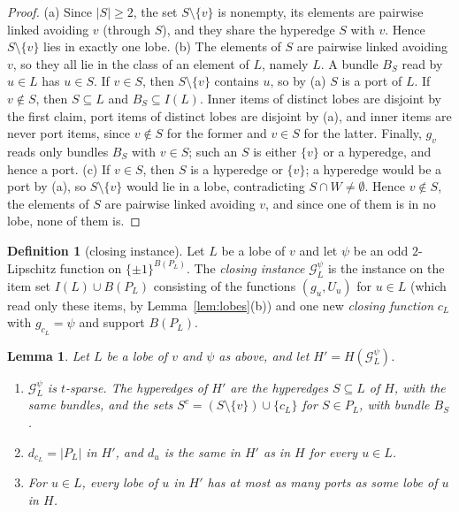 \documentclass[11pt,letterpaper]{article}
\newtheorem{lemma}[theorem]{Lemma}
\theoremstyle{definition}
\newtheorem{definition}[theorem]{Definition}
\newcommand{\cG}{\mathcal{G}}
\newcommand{\cube}[1]{\{\pm1\}^{#1}}
\begin{document}
\begin{proof}
(a) Since $|S|\ge2$, the set $S\setminus\{v\}$ is nonempty, its elements are pairwise linked
avoiding $v$ (through $S$), and they share the hyperedge $S$ with $v$. Hence $S\setminus\{v\}$
lies in exactly one lobe.
(b) The elements of $S$ are pairwise linked avoiding $v$, so they all lie in the class of an
element of $L$, namely $L$. A bundle $B_S$ read by $u\in L$ has $u\in S$. If $v\in S$, then
$S\setminus\{v\}$ contains $u$, so by (a) $S$ is a port of $L$. If $v\notin S$, then $S\subseteq L$
and $B_S\subseteq I(L)$. Inner items of distinct lobes are disjoint by the first claim, port items
of distinct lobes are disjoint by (a), and inner items are never port items, since $v\notin S$ for
the former and $v\in S$ for the latter. Finally, $g_v$ reads only bundles $B_S$ with $v\in S$; such
an $S$ is either $\{v\}$ or a hyperedge, and hence a port.
(c) If $v\in S$, then $S$ is a hyperedge or $\{v\}$; a hyperedge would be a port by (a), so
$S\setminus\{v\}$ would lie in a lobe, contradicting $S\cap W\ne\emptyset$. Hence $v\notin S$, the
elements of $S$ are pairwise linked avoiding $v$, and since one of them is in no lobe, none of them
is.
\end{proof}

\begin{definition}[closing instance]\label{def:closing}
Let $L$ be a lobe of $v$ and let $\psi$ be an odd $2$-Lipschitz function on $\cube{B(P_L)}$. The
\emph{closing instance} $\cG_L^\psi$ is the instance on the item set $I(L)\cup B(P_L)$ consisting
of the functions $(g_u,U_u)$ for $u\in L$ (which read only these items, by
Lemma~\ref{lem:lobes}(b)) and one new \emph{closing function} $c_L$ with $g_{c_L}=\psi$ and support
$B(P_L)$.
\end{definition}

\begin{lemma}\label{lem:closinginstance}
Let $L$ be a lobe of $v$ and $\psi$ as above, and let $H'=H(\cG_L^\psi)$.
\begin{enumerate}[label=(\alph*),itemsep=0pt]
\item $\cG_L^\psi$ is $t$-sparse. The hyperedges of $H'$ are the hyperedges $S\subseteq L$ of $H$,
with the same bundles, and the sets $S^c=(S\setminus\{v\})\cup\{c_L\}$ for $S\in P_L$, with bundle
$B_S$.
\item $d_{c_L}=|P_L|$ in $H'$, and $d_u$ is the same in $H'$ as in $H$ for every $u\in L$.
\item For $u\in L$, every lobe of $u$ in $H'$ has at most as many ports as some lobe of $u$ in $H$.
\end{enumerate}
\end{lemma}
\end{document}
